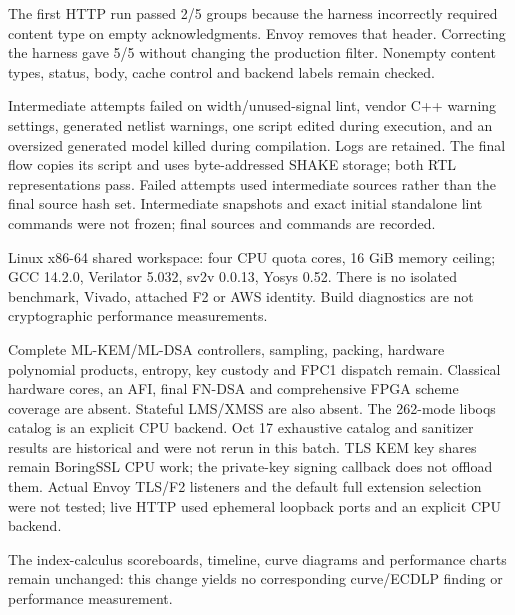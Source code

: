 \documentclass[10pt]{article}
\begin{document}
The first HTTP run passed 2/5 groups because the harness incorrectly required
content type on empty acknowledgments. Envoy removes that header. Correcting
the harness gave 5/5 without changing the production filter. Nonempty content
types, status, body, cache control and backend labels remain checked.

Intermediate attempts failed on width/unused-signal lint, vendor C++ warning
settings, generated netlist warnings, one script edited during execution,
and an oversized generated model killed during compilation. Logs are retained.
The final flow copies its script and uses byte-addressed SHAKE storage; both
RTL representations pass. Failed attempts used intermediate sources rather
than the final source hash set. Intermediate snapshots and exact initial
standalone lint commands were not frozen; final sources and commands are recorded.

Linux x86-64 shared workspace: four CPU quota cores, 16 GiB memory ceiling;
GCC 14.2.0, Verilator 5.032, sv2v 0.0.13, Yosys 0.52.
There is no isolated benchmark, Vivado, attached F2 or AWS identity.
Build diagnostics are not cryptographic performance measurements.

Complete ML-KEM/ML-DSA controllers, sampling, packing, hardware polynomial
products, entropy, key custody and FPC1 dispatch remain. Classical hardware
cores, an AFI, final FN-DSA and comprehensive FPGA scheme coverage are absent.
Stateful LMS/XMSS are also absent. The 262-mode liboqs catalog is an explicit CPU backend. Oct 17 exhaustive
catalog and sanitizer results are historical and were not rerun in this batch.
TLS KEM key shares remain BoringSSL CPU work; the private-key signing callback
does not offload them.
Actual Envoy TLS/F2 listeners and the default full extension selection were
not tested; live HTTP used ephemeral loopback ports and an explicit CPU backend.

The index-calculus scoreboards, timeline, curve diagrams and performance
charts remain unchanged: this change yields no corresponding curve/ECDLP
finding or performance measurement.
\end{document}
